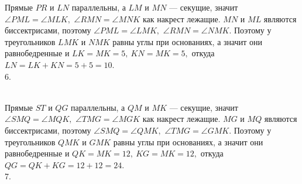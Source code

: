 \documentclass[12pt]{article}
\begin{document}
Прямые $PR$ и $LN$ параллельны, а $LM$ и $MN$ --- секущие, значит $\angle PML = \angle MLK,$  $\angle RMN= \angle MNK$ как накрест лежащие. $MN$ и $ML$ являются биссектрисами, поэтому $\angle PML = \angle LMK,$ $ \angle RMN= \angle NMK.$ Поэтому у треугольников $LMK$ и $NMK$ равны углы при основаниях, а значит они равнобедренные и $LK=MK=5,\ KN=MK=5,$ откуда $LN=LK+KN=5+5=10.$\\
6. \begin{figure}[ht!]
\end{figure}\\
Прямые $ST$ и $QG$ параллельны, а $QM$ и $MK$ --- секущие, значит $\angle SMQ = \angle MQK,$  $\angle TMG= \angle MGK$ как накрест лежащие. $MG$ и $MQ$ являются биссектрисами, поэтому $\angle SMQ = \angle QMK,$ $ \angle TMG= \angle GMK.$ Поэтому у треугольников $QMK$ и $GMK$ равны углы при основаниях, а значит они равнобедренные и $QK=MK=12,\ KG=MK=12,$ откуда $QG=QK+KG=12+12=24.$\\
7. \begin{figure}[ht!]
\end{figure}\\
\end{document}
